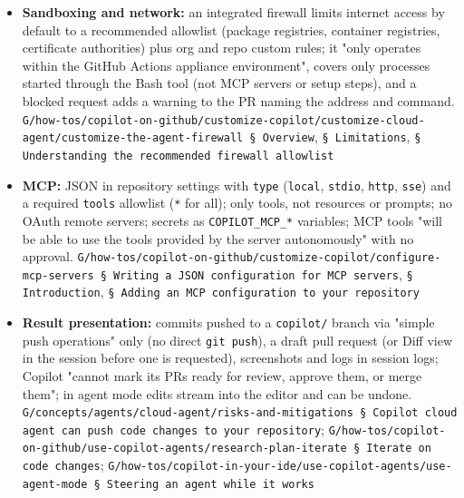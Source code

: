 \begin{itemize}
\item \textbf{Sandboxing and network:} an integrated firewall limits internet access by default to a recommended allowlist (package registries, container registries, certificate authorities) plus org and repo custom rules; it "only operates within the GitHub Actions appliance environment", covers only processes started through the Bash tool (not MCP servers or setup steps), and a blocked request adds a warning to the PR naming the address and command. \texttt{G/\allowbreak{}how-\allowbreak{}tos/\allowbreak{}copilot-\allowbreak{}on-\allowbreak{}github/\allowbreak{}customize-\allowbreak{}copilot/\allowbreak{}customize-\allowbreak{}cloud-\allowbreak{}agent/\allowbreak{}customize-\allowbreak{}the-\allowbreak{}agent-\allowbreak{}firewall § Overview}, \texttt{§ Limitations}, \texttt{§ Understanding the recommended firewall allowlist}
\item \textbf{MCP:} JSON in repository settings with \texttt{type} (\texttt{local}, \texttt{stdio}, \texttt{http}, \texttt{sse}) and a required \texttt{tools} allowlist (\texttt{*} for all); only tools, not resources or prompts; no OAuth remote servers; secrets as \texttt{COPILOT\_\allowbreak{}MCP\_\allowbreak{}*} variables; MCP tools "will be able to use the tools provided by the server autonomously" with no approval. \texttt{G/\allowbreak{}how-\allowbreak{}tos/\allowbreak{}copilot-\allowbreak{}on-\allowbreak{}github/\allowbreak{}customize-\allowbreak{}copilot/\allowbreak{}configure-\allowbreak{}mcp-\allowbreak{}servers § Writing a JSON configuration for MCP servers}, \texttt{§ Introduction}, \texttt{§ Adding an MCP configuration to your repository}
\item \textbf{Result presentation:} commits pushed to a \texttt{copilot/\allowbreak{}} branch via "simple push operations" only (no direct \texttt{git push}), a draft pull request (or Diff view in the session before one is requested), screenshots and logs in session logs; Copilot "cannot mark its PRs ready for review, approve them, or merge them"; in agent mode edits stream into the editor and can be undone. \texttt{G/\allowbreak{}concepts/\allowbreak{}agents/\allowbreak{}cloud-\allowbreak{}agent/\allowbreak{}risks-\allowbreak{}and-\allowbreak{}mitigations § Copilot cloud agent can push code changes to your repository}; \texttt{G/\allowbreak{}how-\allowbreak{}tos/\allowbreak{}copilot-\allowbreak{}on-\allowbreak{}github/\allowbreak{}use-\allowbreak{}copilot-\allowbreak{}agents/\allowbreak{}research-\allowbreak{}plan-\allowbreak{}iterate § Iterate on code changes}; \texttt{G/\allowbreak{}how-\allowbreak{}tos/\allowbreak{}copilot-\allowbreak{}in-\allowbreak{}your-\allowbreak{}ide/\allowbreak{}use-\allowbreak{}copilot-\allowbreak{}agents/\allowbreak{}use-\allowbreak{}agent-\allowbreak{}mode § Steering an agent while it works}
\end{itemize}

